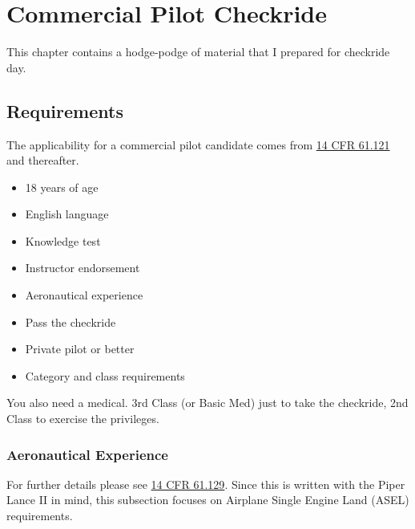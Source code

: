 \chapter{Commercial Pilot Checkride}

This chapter contains a hodge-podge of material that I prepared for checkride day.

\section{Requirements}

The applicability for a commercial pilot candidate comes from \href{https://www.ecfr.gov/current/title-14/chapter-I/subchapter-D/part-61/subpart-F/section-61.121}{14 CFR 61.121} and thereafter.

\begin{itemize}
    \item 18 years of age
    \item English language
    \item Knowledge test
    \item Instructor endorsement
    \item Aeronautical experience
    \item Pass the checkride
    \item Private pilot or better
    \item Category and class requirements
\end{itemize}

You also need a medical. 3rd Class (or Basic Med) just to take the checkride, 2nd Class to exercise the privileges.

\subsection{Aeronautical Experience}

For further details please see \href{https://www.ecfr.gov/current/title-14/chapter-I/subchapter-D/part-61/subpart-F/section-61.129}{14 CFR 61.129}. Since this is written with the Piper Lance II in mind, this subsection focuses on Airplane Single Engine Land (ASEL) requirements.

